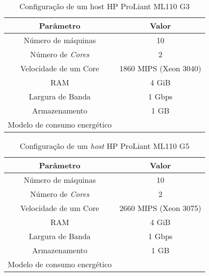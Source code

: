 \begin{table}
	\centering
    \begin{tabular}{|c|c|}
    \hline
    \textbf{Parâmetro}            & \textbf{Valor}     \\ \hline
    Número de máquinas            & 10                            \\
    Número de \emph{Cores}        & 2                             \\
    Velocidade de um Core         & 1860 MIPS (Xeon 3040)         \\
    RAM                           & 4 GiB                         \\
    Largura de Banda              & 1 Gbps                        \\
    Armazenamento                 & 1 GB                          \\
    Modelo de consumo energético  & \cite{spec:proliant_ml110_g3} \\ \hline
    \end{tabular}
    \caption {Configuração de um host HP ProLiant ML110 G3}
    \label{tab:configuracao_hp_g3}
\end{table}



\begin{table}
	\centering
    \begin{tabular}{|c|c|}
    \hline
    \textbf{Parâmetro}            & \textbf{Valor}     \\ \hline
    Número de máquinas            & 10                            \\
    Número de \emph{Cores}        & 2                             \\
    Velocidade de um Core         & 2660 MIPS (Xeon 3075)         \\
    RAM                           & 4 GiB                         \\
    Largura de Banda              & 1 Gbps                        \\
    Armazenamento                 & 1 GB                          \\
    Modelo de consumo energético  & \cite{spec:proliant_ml110_g5} \\ \hline
    \end{tabular}
    \caption {Configuração de um \emph{host} HP ProLiant ML110 G5}
    \label{tab:configuracao_hp_g5}
\end{table}

